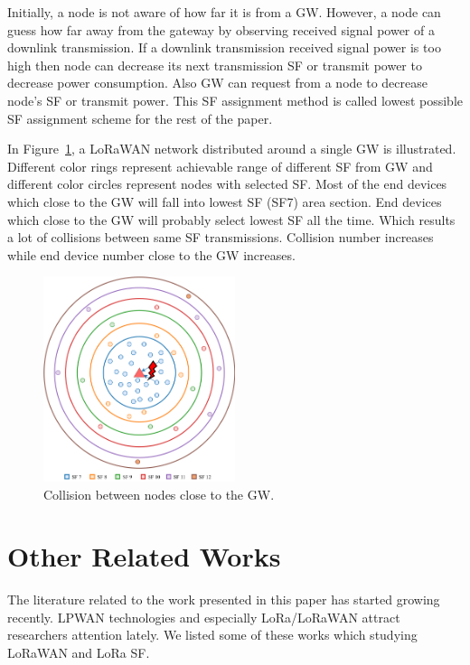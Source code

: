 \documentclass[conference]{IEEEtran}
\begin{document}
\par Initially, a node is not aware of how far it is from a GW. However, a node can guess how far away from the gateway by observing received signal power of a downlink transmission. If a downlink transmission received signal power is too high then node can decrease its next transmission SF or transmit power to decrease power consumption. Also GW can request from a node to decrease node's SF or transmit power. This SF assignment method is called lowest possible SF assignment scheme for the rest of the paper.

\par In Figure~\ref{fig:collision}, a LoRaWAN network distributed around a single GW is illustrated. Different color rings represent achievable range of different SF from GW and different color circles represent nodes with selected SF. Most of the end devices which close to the GW will fall into lowest SF (SF7) area section. End devices which close to the GW will probably select lowest SF all the time. Which results a lot of collisions between same SF transmissions. Collision number increases while end device number close to the GW increases.

\begin{figure}
\centering
\includegraphics[width=0.5\textwidth]{collision}
\caption{Collision between nodes close to the GW.}
\label{fig:collision}
\end{figure}


\section{Other Related Works} \label{Other Related Works}
The literature related to the work presented in this paper has started growing recently. LPWAN technologies and especially LoRa/LoRaWAN attract researchers attention lately. We listed some of these works which studying LoRaWAN and LoRa SF.
\end{document}
